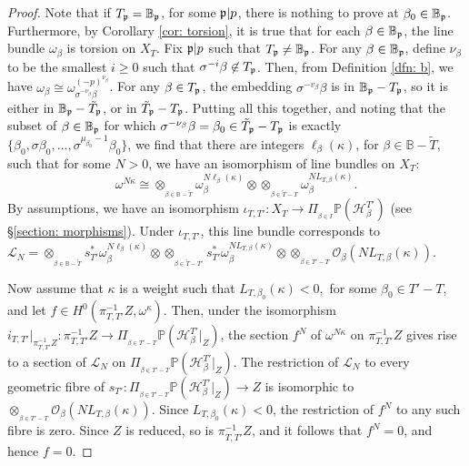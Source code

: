 \documentclass[11pt,pdflatex]{amsart}
\theoremstyle{plain}
\theoremstyle{definition}
\theoremstyle{plain}
\theoremstyle{definition}
\theoremstyle{remark}
\numberwithin{equation}{section}
\numberwithin{figure}{section} \numberwithin{table}{subsection}
\newcommand{\gerp}{{\frak{p}}}
\newcommand{\calH}{{\mathcal{H}}}
\newcommand{\calL}{{\mathcal{L}}}
\newcommand{\calO}{{\mathcal{O}}}
\def\BB{\mathbb{B}}
\def\PP{\mathbb{P}}
\begin{document}
\begin{proof} Note that if $T_\gerp=\BB_\gerp$, for some $\gerp|p$, there is nothing to prove at $\beta_0 \in \BB_\gerp$.  Furthermore, by Corollary \ref{cor: torsion}, it is true that for each $\beta \in \BB_\gerp$, the line bundle $\omega_\beta$ is torsion on $X_T$.
Fix $\gerp|p$ such that $T_\gerp \neq  \BB_\gerp$.   For any $\beta \in \BB_\gerp$, define $\nu_\beta$ to be the smallest $i\geq0$ such that $\sigma^{-i}\beta \not \in T_\gerp$. Then, from Definition \ref{dfn: b}, we have $\omega_\beta \cong \omega_{\sigma^{-\nu_\beta}\beta}^{(-p)^{\nu_\beta}}$. For any $\beta \in T_\gerp$, the embedding  $\sigma^{-v_\beta}\beta$ is in $\BB_\gerp-T_\gerp$, so it is either in $\BB_\gerp-\tilde{T}_\gerp$, or in $\tilde{T}_\gerp-T_\gerp$.  Putting all this together, and noting that the subset of $\beta \in \BB_\gerp$ for which $\sigma^{-\nu_\beta}\beta=\beta_0 \in \tilde{T}_\gerp-T_\gerp$ is exactly $\{\beta_0,\sigma\beta_0,...,\sigma^{\mu_{\beta_0}-1}\beta_0\}$, we find that there are integers $\ell_\beta(\kappa)$, for $\beta \in \BB-\tilde{T}$, such that  for some $N>0$, we have an isomorphism of line bundles on $X_T$:
 $$\omega^{N\kappa} \cong \otimes_{_{\beta \in \BB-\tilde{T}}} \omega_\beta^{N\ell_\beta(\kappa)} \otimes \otimes_{_{\beta \in \tilde{T}-T}} \omega_\beta^{NL_{T,\beta}(\kappa)}.$$
By assumptions, we have an isomorphism $\iota_{T,T'}: X_T \rightarrow \Pi_{_{\beta \in I}} \PP(\calH^{T'}_{\beta})$ (see \S \ref{section: morphisms}). Under $\iota_{T,T'}$, this line bundle corresponds to $\calL_N=\otimes_{_{\beta \in \BB-\tilde{T}}} s_{T'}^*\omega_\beta^{N\ell_\beta(\kappa)} \otimes  \otimes_{_{\beta \in \tilde{T}-T'}} s_{T'}^*\omega_\beta^{ NL_{T,\beta}(\kappa)} \otimes \otimes_{_{\beta \in T'-T}} \calO_{\beta}(NL_{T,\beta}(\kappa))$. 

Now assume that $\kappa$ is a weight such that $L_{T,\beta_0}(\kappa)<0,$ for some $\beta_0 \in T'-T$, and let $f \in H^0(\pi_{T,T'}^{-1}Z,\omega^{\kappa})$.
Then, under the isomorphism $i_{T,T'}|_{\pi_{T,T'}^{-1}Z}: \pi_{T,T'}^{-1}Z \rightarrow \Pi_{_{\beta \in T'-T}} \PP(\calH^{T'}_{\beta}|_Z)$, the section  $f^N$ of 
$\omega^{N\kappa}$ on $\pi_{T,T'}^{-1}Z$
gives rise to a section of $\calL_N$ on $\Pi_{_{\beta \in T'-T}} \PP(\calH^{T'}_{\beta}|_Z)$. 
The restriction of $\calL_N$ to every geometric fibre of 
$s_{T'}:\Pi_{_{\beta \in T'-T}} \PP(\calH^{T'}_{\beta}|_Z) \rightarrow Z$ is isomorphic to $\otimes_{_{\beta \in T'-T}} \calO_{\beta}(NL_{T,\beta}(\kappa))$.  
Since $L_{T,\beta_{0}}(\kappa)<0$, the restriction of $f^N$ to any such fibre is zero. Since $Z$ is reduced, so is $\pi_{T,T'}^{-1}Z$, and it follows that $f^N=0$, and hence $f=0$. 
\end{proof}
\end{document}
